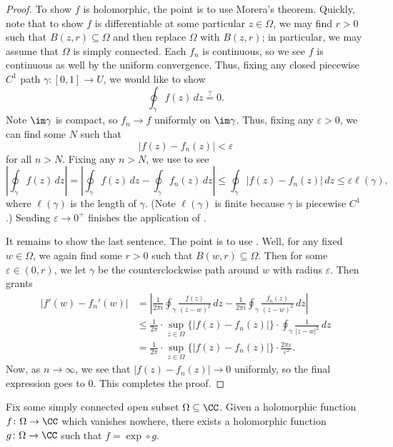 \documentclass[notes.tex]{subfiles}
\begin{document}
\begin{proof}
	To show $f$ is holomorphic, the point is to use Morera's theorem. Quickly, note that to show $f$ is differentiable at some particular $z\in\Omega$, we may find $r>0$ such that $B(z,r)\subseteq\Omega$ and then replace $\Omega$ with $B(z,r)$; in particular, we may assume that $\Omega$ is simply connected. Each $f_n$ is continuous, so we see $f$ is continuous as well by the uniform convergence. Thus, fixing any closed piecewise $C^1$ path $\gamma\colon[0,1]\to U$, we would like to show
	\[\oint_\gamma f(z)\,dz\stackrel?=0.\]
	Note $\im\gamma$ is compact, so $f_n\to f$ uniformly on $\im\gamma$. Thus, fixing any $\varepsilon>0$, we can find some $N$ such that
	\[|f(z)-f_n(z)|<\varepsilon\]
	for all $n>N$. Fixing any $n>N$, we use  to see
	\[\left|\oint_\gamma f(z)\,dz\right|=\left|\oint_\gamma f(z)\,dz-\oint_\gamma f_n(z)\,dz\right|\le\oint_\gamma|f(z)-f_n(z)|\,dz\le\varepsilon\ell(\gamma),\]
	where $\ell(\gamma)$ is the length of $\gamma$. (Note $\ell(\gamma)$ is finite because $\gamma$ is piecewise $C^1$.) Sending $\varepsilon\to0^+$ finishes the application of .

	It remains to show the last sentence. The point is to use . Well, for any fixed $w\in\Omega$, we again find some $r>0$ such that $B(w,r)\subseteq\Omega$. Then for some $\varepsilon\in(0,r)$, we let $\gamma$ be the counterclockwise path around $w$ with radius $\varepsilon$. Then  grants
	\begin{align*}
		|f'(w)-f_n'(w)| &= \left|\frac1{2\pi i}\oint_\gamma\frac{f(z)}{(z-w)^2}\,dz-\frac1{2\pi i}\oint_\gamma\frac{f_n(z)}{(z-w)^2}\,dz\right| \\
		&\le \frac1{2\pi}\cdot\sup_{z\in\Omega}\{|f(z)-f_n(z)|\}\cdot\oint_\gamma\frac1{|z-w|^2}\,dz \\
		&= \frac1{2\pi}\cdot\sup_{z\in\Omega}\{|f(z)-f_n(z)|\}\cdot\frac{2\pi\varepsilon}{\varepsilon^2}.
	\end{align*}
	Now, as $n\to\infty$, we see that $|f(z)-f_n(z)|\to0$ uniformly, so the final expression goes to $0$. This completes the proof.
\end{proof}
\begin{lemma} \label{lem:no-vanish-has-log}
	Fix some simply connected open subset $\Omega\subseteq\CC$. Given a holomorphic function $f\colon\Omega\to\CC$ which vanishes nowhere, there exists a holomorphic function $g\colon\Omega\to\CC$ such that $f={\exp}\circ g$.
\end{lemma}
\end{document}
